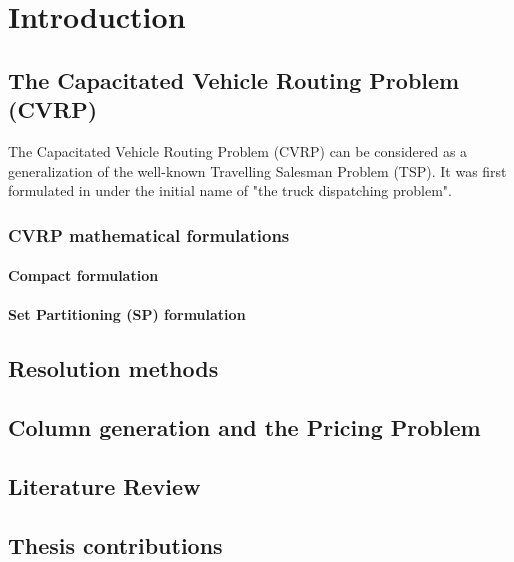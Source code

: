 \chapter{Introduction}

\section{The Capacitated Vehicle Routing Problem (CVRP)}

The Capacitated Vehicle Routing Problem (CVRP) can be considered as a generalization of
the well-known Travelling Salesman Problem (TSP).
It was first formulated in \cite{dantzig1959truck}
under the initial name of "the truck dispatching problem".

\subsection{CVRP mathematical formulations}

\subsubsection{Compact formulation}

\subsubsection{Set Partitioning (SP) formulation}

\section{Resolution methods}

\section{Column generation and the Pricing Problem}

\section{Literature Review}

\section{Thesis contributions}
